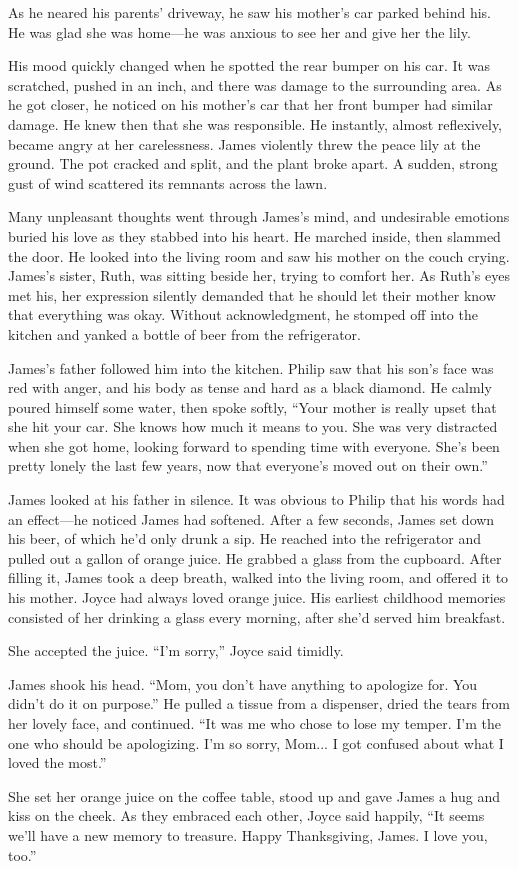 As he neared his parents' driveway, he saw his mother's car parked behind his. He was glad she was home—he was anxious to see her and give her the lily.

His mood quickly changed when he spotted the rear bumper on his car. It was scratched, pushed in an inch, and there was damage to the surrounding area. As he got closer, he noticed on his mother's car that her front bumper had similar damage. He knew then that she was responsible. He instantly, almost reflexively, became angry at her carelessness. James violently threw the peace lily at the ground. The pot cracked and split, and the plant broke apart. A sudden, strong gust of wind scattered its remnants across the lawn.

Many unpleasant thoughts went through James's mind, and undesirable emotions buried his love as they stabbed into his heart. He marched inside, then slammed the door. He looked into the living room and saw his mother on the couch crying. James's sister, Ruth, was sitting beside her, trying to comfort her. As Ruth's eyes met his, her expression silently demanded that he should let their mother know that everything was okay. Without acknowledgment, he stomped off into the kitchen and yanked a bottle of beer from the refrigerator.

James's father followed him into the kitchen. Philip saw that his son's face was red with anger, and his body as tense and hard as a black diamond. He calmly poured himself some water, then spoke softly,	“Your mother is really upset that she hit your car. She knows how much it means to you. She was very distracted when she got home, looking forward to spending time with everyone. She's been pretty lonely the last few years, now that everyone's moved out on their own.”

James looked at his father in silence. It was obvious to Philip that his words had an effect—he noticed James had softened. After a few seconds, James set down his beer, of which he'd only drunk a sip. He reached into the refrigerator and pulled out a gallon of orange juice. He grabbed a glass from the cupboard. After filling it, James took a deep breath, walked into the living room, and offered it to his mother. Joyce had always loved orange juice. His earliest childhood memories consisted of her drinking a glass every morning, after she'd served him breakfast.

She accepted the juice. “I'm sorry,” Joyce said timidly.

James shook his head. “Mom, you don't have anything to apologize for. You didn't do it on purpose.” He pulled a tissue from a dispenser, dried the tears from her lovely face, and continued. “It was me who chose to lose my temper. I'm the one who should be apologizing. I'm so sorry, Mom... I got confused about what I loved the most.”

She set her orange juice on the coffee table, stood up and gave James a hug and kiss on the cheek. As they embraced each other, Joyce said happily, “It seems we'll have a new memory to treasure. Happy Thanksgiving, James. I love you, too.”